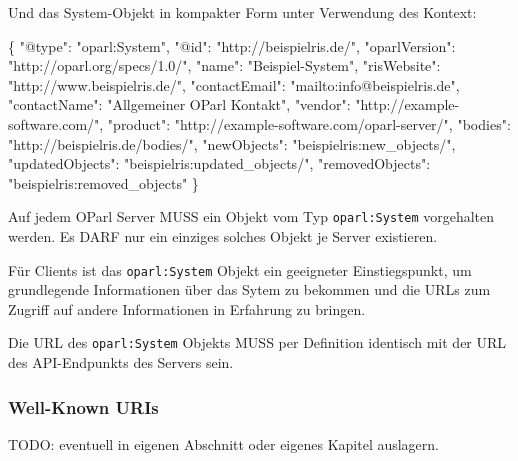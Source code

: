 \documentclass[,a4paper]{article}
\newenvironment{Shaded}{}{}
\newcommand{\DataTypeTok}[1]{\textcolor[rgb]{0.56,0.13,0.00}{{#1}}}
\newcommand{\StringTok}[1]{\textcolor[rgb]{0.25,0.44,0.63}{{#1}}}
\newcommand{\NormalTok}[1]{{#1}}
\begin{document}
Und das System-Objekt in kompakter Form unter Verwendung des Kontext:

\begin{Shaded}
\begin{Highlighting}[]
\NormalTok{\{}
    \DataTypeTok{"@type"}\NormalTok{: }\StringTok{"oparl:System"}\NormalTok{,}
    \DataTypeTok{"@id"}\NormalTok{: }\StringTok{"http://beispielris.de/"}\NormalTok{,}
    \DataTypeTok{"oparlVersion"}\NormalTok{: }\StringTok{"http://oparl.org/specs/1.0/"}\NormalTok{,}
    \DataTypeTok{"name"}\NormalTok{: }\StringTok{"Beispiel-System"}\NormalTok{,}
    \DataTypeTok{"risWebsite"}\NormalTok{: }\StringTok{"http://www.beispielris.de/"}\NormalTok{,}
    \DataTypeTok{"contactEmail"}\NormalTok{: }\StringTok{"mailto:info@beispielris.de"}\NormalTok{,}
    \DataTypeTok{"contactName"}\NormalTok{: }\StringTok{"Allgemeiner OParl Kontakt"}\NormalTok{,}
    \DataTypeTok{"vendor"}\NormalTok{: }\StringTok{"http://example-software.com/"}\NormalTok{,}
    \DataTypeTok{"product"}\NormalTok{: }\StringTok{"http://example-software.com/oparl-server/"}\NormalTok{,}
    \DataTypeTok{"bodies"}\NormalTok{: }\StringTok{"http://beispielris.de/bodies/"}\NormalTok{,}
    \DataTypeTok{"newObjects"}\NormalTok{: }\StringTok{"beispielris:new_objects/"}\NormalTok{,}
    \DataTypeTok{"updatedObjects"}\NormalTok{: }\StringTok{"beispielris:updated_objects/"}\NormalTok{,}
    \DataTypeTok{"removedObjects"}\NormalTok{: }\StringTok{"beispielris:removed_objects"}
\NormalTok{\}}
\end{Highlighting}
\end{Shaded}

Auf jedem OParl Server MUSS ein Objekt vom Typ \texttt{oparl:System}
vorgehalten werden. Es DARF nur ein einziges solches Objekt je Server
existieren.

Für Clients ist das \texttt{oparl:System} Objekt ein geeigneter
Einstiegspunkt, um grundlegende Informationen über das Sytem zu bekommen
und die URLs zum Zugriff auf andere Informationen in Erfahrung zu
bringen.

Die URL des \texttt{oparl:System} Objekts MUSS per Definition identisch
mit der URL des API-Endpunkts des Servers sein.

\subsubsection{Well-Known URIs}\label{well-known-uris}

TODO: eventuell in eigenen Abschnitt oder eigenes Kapitel auslagern.
\end{document}
